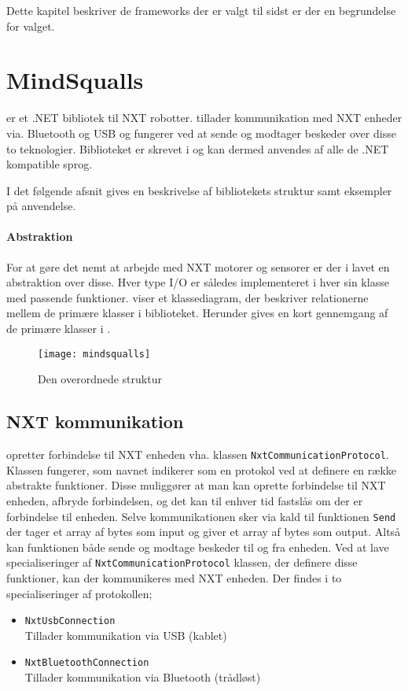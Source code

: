 Dette kapitel beskriver de frameworks der er valgt til sidst er der en begrundelse for valget.

\section{MindSqualls}\label{mindsqualls}
\mindsqualls er et .NET bibliotek til \legos NXT robotter.
\mindsqualls tillader kommunikation med NXT enheder via. Bluetooth og USB og fungerer ved at sende og modtager beskeder over disse to teknologier.
Biblioteket er skrevet i \csharp og kan dermed anvendes af alle de .NET kompatible sprog.

I det følgende afsnit gives en beskrivelse af bibliotekets struktur samt eksempler på anvendelse.

\paragraph{Abstraktion}
For at gøre det nemt at arbejde med NXT motorer og sensorer er der i \mindsqualls lavet en abstraktion over disse.
Hver type I/O er således implementeret i hver sin klasse med passende funktioner.
 viser et klassediagram, der beskriver relationerne mellem de primære klasser i \mindsqualls biblioteket.
Herunder gives en kort gennemgang af de primære klasser i \mindsqualls.

\begin{figure}
\centering
\texttt{[image: mindsqualls]}
\caption{Den overordnede \mindsqualls struktur}
\label{mindsqualls:structure}
\end{figure}

\subsection{NXT kommunikation}
\mindsqualls opretter forbindelse til NXT enheden vha. klassen \lstinline[style=csharp]!NxtCommunicationProtocol!.
Klassen fungerer, som navnet indikerer som en protokol ved at definere en række abstrakte funktioner.
Disse muliggører at man kan oprette forbindelse til NXT enheden, afbryde forbindelsen, og det kan til enhver tid fastslås om der er forbindelse til enheden.
Selve kommunikationen sker via kald til funktionen \lstinline[style=csharp]!Send! der tager et array af bytes som input og giver et array af bytes som output.
Altså kan funktionen både sende og modtage beskeder til og fra enheden.
Ved at lave specialiseringer af \lstinline[style=csharp]!NxtCommunicationProtocol! klassen, der definere disse funktioner, kan der kommunikeres med NXT enheden.
Der findes i \mindsqualls to specialiseringer af protokollen;
\begin{itemize}
\item \lstinline[style=csharp]!NxtUsbConnection!\\
Tillader kommunikation via USB (kablet)
\item \lstinline[style=csharp]!NxtBluetoothConnection!\\
Tillader kommunikation via Bluetooth (trådløst)
\end{itemize}

